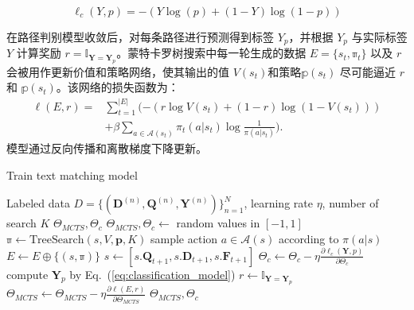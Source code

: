 \begin{equation}
\label{eq:classification_loss}
\ell_c(Y, p) = -\left(Y\log(p) + (1-Y)\log (1-p)\right)
\end{equation}

在路径判别模型收敛后，对每条路径进行预测得到标签 $Y_p$，并根据 $Y_p$ 与实际标签 $Y$ 计算奖励 $r= \mathbb{I}_{\mathbf{Y} = \mathbf{Y}_p}$。蒙特卡罗树搜索中每一轮生成的数据 $E=\{s_t, \mathbb{\pi}_t\}$ 以及 $r$ 会被用作更新价值和策略网络，使其输出的值 $V(s_t)$和策略$\mathbb{p}(s_t)$ 尽可能逼近 $r$ 和 $\mathbb{p}(s_t)$。该网络的损失函数为：
\begin{equation}
\label{eq:loss}
\begin{aligned}
  \ell(E, r) = &\sum_{t=1}^{|E|} (-(r\log V(s_t) + (1-r)\log (1-V(s_t)))  \\
  &+ \beta\sum_{a\in\mathcal{A}(s_t)}\pi_t(a|s_t) \log \frac{1}{\pi(a|s_t)}).
\end{aligned}
\end{equation}
模型通过反向传播和离散梯度下降更新。

\begin{algorithm}[!htbp]
\caption{Train text matching model}\label{alg:Train}
\renewcommand{\algorithmicrequire}{\textbf{Input:}}
\renewcommand{\algorithmicensure}{\textbf{Output:}}
\begin{algorithmic}[1]
\Require Labeled data $D=\{ (\mathbf{D}^{(n)}, \mathbf{Q}^{(n)}, \mathbf{Y}^{(n)})\}_{n=1}^N$, learning rate $\eta$, number of search $K$
\Ensure $\Theta_{MCTS}, \Theta_{c}$
\State {} $\Theta_{MCTS}, \Theta_{c} \leftarrow$ random values in $[-1, 1]$
\Repeat
            \State $\mathbb{\pi} \leftarrow \mathrm{TreeSearch}(s, V, \mathbf{p}, K)$ 
      \State sample action ${a\in\mathcal{A}(s)}$ according to $\pi(a|s)$
      \State $E\leftarrow E \oplus \{(s, \mathbb{\pi})\}$
      \State $s \leftarrow [s.\mathbf{Q}_{t+1}, s.\mathbf{D}_{t+1}, s.\mathbf{F}_{t+1}]$
    \EndWhile
    \State $\Theta_{c} \leftarrow \Theta_{c} - \eta \frac{\partial \ell_c(\mathbf{Y}, p)}{\partial \Theta_{c}}$  
    \EndWhile
    \State compute $\mathbf{Y}_p$ by Eq.~(\ref{eq:classification_model})
    \State $r \leftarrow \mathbb{I}_{\mathbf{Y} = \mathbf{Y}_p}$
    \State $\Theta_{MCTS} \leftarrow \Theta_{MCTS} -\eta \frac{\partial \ell(E, r)}{\partial \Theta_{MCTS}}$ 
  \EndFor
{}
\State\Return $\Theta_{MCTS}, \Theta_{c}$
\end{algorithmic}
\end{algorithm}

